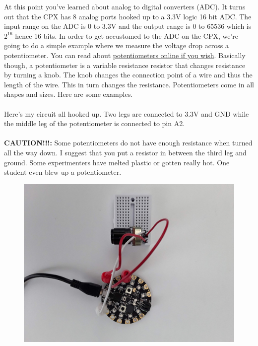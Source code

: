 At this point you've learned about analog to digital converters (ADC). It turns out that the CPX has 8 analog ports hooked up to a 3.3V logic 16 bit ADC. The input range on the ADC is 0 to 3.3V and the output range is 0 to 65536 which is $2^{16}$ hence 16 bits. In order to get accustomed to the ADC on the CPX, we’re going to do a simple example where we measure the voltage drop across a potentiometer. You can read about \href{https://www.build-electronic-circuits.com/potentiometer/}{potentiometers online if you wish}. Basically though, a potentiometer is a variable resistance resistor that changes resistance by turning a knob. The knob changes the connection point of a wire and thus the length of the wire. This in turn changes the resistance. Potentiometers come in all shapes and sizes. Here are some examples.
\ \\
\ \\
Here’s my circuit all hooked up. Two legs are connected to 3.3V and GND while the middle leg of the potentiometer is connected to pin A2.
\ \\
\ \\
{\bf CAUTION!!!:} Some potentiometers do not have enough resistance when turned all the way down. I suggest that you put a resistor in between the third leg and ground. Some experimenters have melted plastic or gotten really hot. One student even blew up a potentiometer.
\begin{figure}[H]
  \begin{center}
    \includegraphics[width=\textwidth]{Figures/potentiometer1.jpeg}
  \end{center}
\end{figure}
